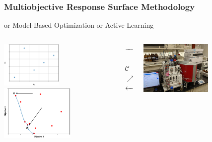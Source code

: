 \documentclass[aspectratio=169]{beamer}
\begin{document}
\begin{frame}\frametitle{Multiobjective Response Surface Methodology}
{or Model-Based Optimization or Active Learning}
\begin{columns}
\begin{column}{0.4\textwidth}
\begin{center}
\includegraphics[width=0.5\textwidth]{lh_doe.eps}\\%
\medskip
\vskip 0.5cm
\medskip
\includegraphics[width=0.6\textwidth]{tradeoff.eps}%
\end{center}
\end{column}
\begin{column}{0.2\textwidth}
\begin{center}
$\xrightarrow{\hspace*{1.5cm}}$%
\\
\vskip 1.2cm
$\qquad\qquad\nearrow$\\
{\Huge $\mathcal{C}$}\\
$\nearrow\qquad\qquad$%
\\
\vskip 1cm
$\xleftarrow{\hspace*{1.5cm}}$%
\end{center}
\end{column}
\begin{column}{0.4\textwidth}
\begin{center}
\includegraphics[width=0.58\textwidth]{lab_setup.jpg}%

\end{center}
\end{column}
\end{columns}
\end{frame}
\end{document}
